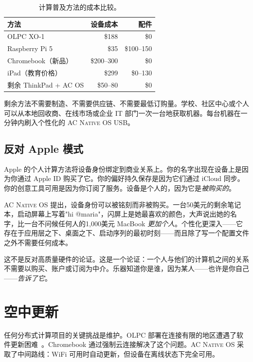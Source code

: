 \documentclass[10pt,letterpaper,twocolumn]{article}
\newcommand{\acos}{\textsc{AC Native OS}}
\begin{document}
\begin{table}[h]
\small
\centering
\begin{tabular}{lrr}
\toprule
\textbf{方法} & \textbf{设备成本} & \textbf{配件} \\
\midrule
OLPC XO-1 & \$188 & \$0 \\
Raspberry Pi 5 & \$35 & \$100--150 \\
Chromebook（新品） & \$200--300 & \$0 \\
iPad（教育价格） & \$299 & \$0--130 \\
剩余 ThinkPad + AC OS & \$50--80 & \$0 \\
\bottomrule
\end{tabular}
\caption{计算普及方法的成本比较。}
\label{tab:cost}
\end{table}

剩余方法不需要制造、不需要供应链、不需要最低订购量。学校、社区中心或个人可以从本地回收商、在线市场或企业 IT 部门一次一台地获取机器。每台机器在一分钟内刷入个性化的 \acos{} USB。

\subsection{反对 Apple 模式}

Apple 的个人计算方法将设备身份绑定到商业关系上。你的名字出现在设备上是因为你通过 Apple ID 购买了它。你的偏好持久保存是因为它们通过 iCloud 同步。你的创意工具可用是因为你订阅了服务。设备是个人的，因为它是\emph{被购买的}。

\acos{} 提出，设备身份可以被铭刻而非被购买。一台50美元的剩余笔记本，启动屏幕上写着"hi @maria"，闪屏上是她最喜欢的颜色，大声说出她的名字，比一台不问候任何人的1,000美元 MacBook \emph{更加个人}。个性化更深入——它存在于应用层之下、桌面之下、启动序列的最初时刻——而且除了写一个配置文件之外不需要任何成本。

这不是反对高质量硬件的论证。这是一个论证：一个人与他们的计算机之间的关系不需要以购买、账户或订阅为中介。乐器知道你是谁，因为某人——也许是你自己——\emph{告诉了它}。


\section{空中更新}
\label{sec:ota}

任何分布式计算项目的关键挑战是维护。OLPC 部署在连接有限的地区遭遇了软件更新困难~\citep{warschauer2004technology}。Chromebook 通过强制云连接解决了这个问题。\acos{} 采取了中间路线：WiFi 可用时自动更新，但设备在离线状态下完全可用。
\end{document}
